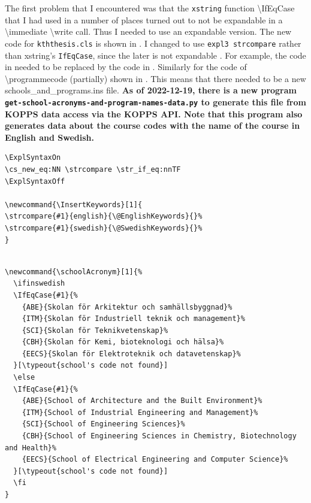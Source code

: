 The first problem that I encountered was that the \texttt{xstring} function \textbackslash IfEqCase that I had used in a number of places turned out to not be expandable in a \textbackslash immediate \textbackslash write call. Thus I needed to use an expandable version. The new code for \texttt{kththesis.cls} is shown in . I changed to use \texttt{expl3 strcompare} rather than xstring's \texttt{IfEqCase}, since the later is not expandable . For example, the code in  needed to be replaced by the code in . Similarly for the code of \textbackslash programmecode (partially) shown in . This means that there needed to be a new schools\_and\_programs.ins file. \textbf{As of 2022-12-19, there is a new program \texttt{get-school-acronyms-and-program-names-data.py} to generate this file from KOPPS data access via the KOPPS API. Note that this program also generates data about the course codes with the name of the course in English and Swedish.}
\begin{lstlisting}[language={[LaTeX]TeX}, caption={New version of \textbackslash InsertKeywords together with making the expl3 \textbackslash strcompare function available}, label=lst:InsertKeywords]
\ExplSyntaxOn
\cs_new_eq:NN \strcompare \str_if_eq:nnTF
\ExplSyntaxOff

\newcommand{\InsertKeywords}[1]{
\strcompare{#1}{english}{\@EnglishKeywords}{}%
\strcompare{#1}{swedish}{\@SwedishKeywords}{}%
}
\end{lstlisting}

\begin{lstlisting}[language={[LaTeX]TeX}, caption={Original \textbackslash schoolAcronym}, label=lst:originalSchoolAcronym] 
	
\newcommand{\schoolAcronym}[1]{%
  \ifinswedish
  \IfEqCase{#1}{%
    {ABE}{Skolan för Arkitektur och samhällsbyggnad}%
    {ITM}{Skolan för Industriell teknik och management}%
    {SCI}{Skolan för Teknikvetenskap}%
    {CBH}{Skolan för Kemi, bioteknologi och hälsa}%
    {EECS}{Skolan för Elektroteknik och datavetenskap}%
  }[\typeout{school's code not found}]
  \else
  \IfEqCase{#1}{%
    {ABE}{School of Architecture and the Built Environment}%
    {ITM}{School of Industrial Engineering and Management}%
    {SCI}{School of Engineering Sciences}%
    {CBH}{School of Engineering Sciences in Chemistry, Biotechnology and Health}%
    {EECS}{School of Electrical Engineering and Computer Science}%
  }[\typeout{school's code not found}]
  \fi
}
\end{lstlisting}

